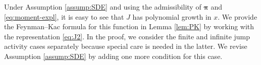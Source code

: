 \documentclass[11pt]{article}
\newcommand{\1}{\mathbbm{1}}
\newcommand{\bpi}{\boldsymbol{\pi}}
\begin{document}















Under Assumption \ref{assump:SDE} and using the admissibility of $\bpi$ and \eqref{eq:moment-expl}, it is easy to see that $J$ has polynomial growth in $x$. We provide the Feynman--Kac formula for this function in Lemma \ref{lem:PK} by working with the representation \eqref{eq:J2}. In the proof, we consider the finite and infinite jump activity cases separately because special care is needed in the latter. We revise Assumption \ref{assump:SDE} by adding one more condition for this case.
\end{document}
